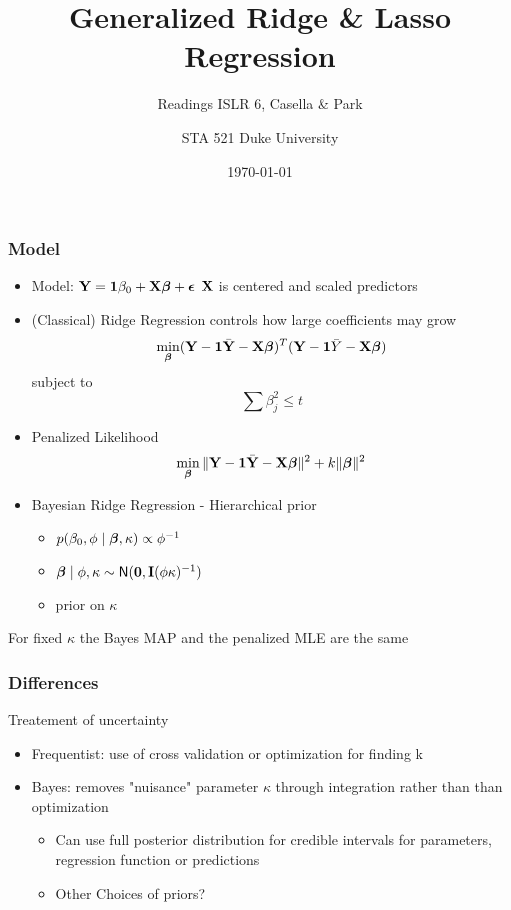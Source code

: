 \documentclass[handout]{beamer}\usepackage[]{graphicx}\usepackage[]{color}
\title{Generalized Ridge \& Lasso Regression}
\subtitle{Readings ISLR 6,  Casella \& Park }
\institute{Merlise Clyde}
\author{STA 521  Duke University}
\date{\today}
\begin{document}
\maketitle


\begin{frame} \frametitle{Model}

\begin{itemize}
\item Model: $\mathbf{Y} = \mathbf{1} \beta_0 + \mathbf{X} \boldsymbol{\beta} + \boldsymbol{\epsilon}$  $\mathbf{X}$ is centered and scaled predictors
\pause
\item (Classical) Ridge Regression controls
 how large coefficients may grow \pause
    $$\min_{\boldsymbol{\beta}} (\mathbf{Y} - \mathbf{1} \bar{\mathbf{Y}}  - \mathbf{X} \boldsymbol{\beta})^T (\mathbf{Y} -\mathbf{1} \bar{Y}  - \mathbf{X}\boldsymbol{\beta})$$
    subject to
    $$ \sum \beta_j^2 \le t$$ \pause
  \item Penalized Likelihood
    $$\min_{\boldsymbol{\beta}} \| \mathbf{Y} - \mathbf{1}  \bar{\mathbf{Y}}  - \mathbf{X} \boldsymbol{\beta}\|^2 + k \|\boldsymbol{\beta}\|^2$$ \pause
\item  Bayesian Ridge Regression - Hierarchical prior \pause
\begin{itemize}
\item $p(\beta_0,  \phi \mid \boldsymbol{\beta}, \kappa) \propto \phi^{-1}$ \pause
\item $\boldsymbol{\beta} \mid \phi, \kappa \sim \textsf{N}(\mathbf{0}, \mathbf{I} (\phi \kappa )^{-1})$ \pause
\item prior on $\kappa$
\end{itemize}
\end{itemize}
For fixed $\kappa$ the Bayes MAP and the penalized MLE are the same
\end{frame}



\begin{frame} \frametitle{Differences}

Treatement of uncertainty  \pause
\begin{itemize}
\item Frequentist:  use of cross validation or optimization for finding  k  \pause
\item Bayes: removes "nuisance" parameter $\kappa$ through integration rather than than optimization  \pause
\begin{itemize}
\item  Can use full posterior distribution for credible intervals for parameters, regression function or predictions
 \pause
\item Other Choices of priors?
\end{itemize}
\end{itemize}

\end{frame}
\end{document}

